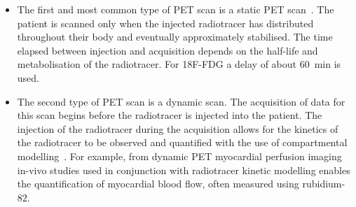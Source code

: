                \begin{itemize}
                    \item The first and most common type of \gls{PET} scan is a static \gls{PET} scan~\parencite{Muzi2012QuantitativeImaging}. The patient is scanned only when the injected radiotracer has distributed throughout their body and eventually approximately stabilised. %
                    The time elapsed between injection and acquisition depends on the half-life and metabolisation of the radiotracer. For \gls{18F-FDG} a delay of about \SI{60}{\minute} is used.
                    
                    \item The second type of \gls{PET} scan is a dynamic scan. The acquisition of data for this scan begins before the radiotracer is injected into the patient. The injection of the radiotracer during the acquisition allows for the kinetics of the radiotracer to be observed and quantified with the use of compartmental modelling~\parencite{DynamicPETImagingLammertsma}. For example, from dynamic \gls{PET} myocardial perfusion imaging %
                    in-vivo studies used in conjunction with radiotracer kinetic modelling enables the quantification of myocardial blood flow, often measured using rubidium-$82$. %
                \end{itemize}
            
